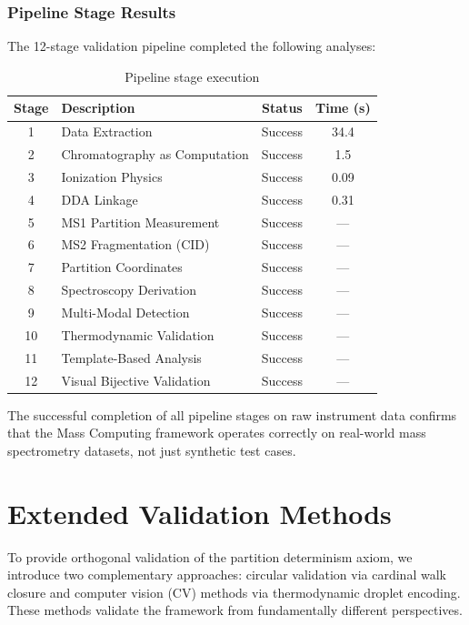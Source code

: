 \documentclass[twocolumn,10pt]{article}
\begin{document}
\subsubsection{Pipeline Stage Results}

The 12-stage validation pipeline completed the following analyses:

\begin{table}[H]
\centering
\caption{Pipeline stage execution}
\label{tab:pipeline_stages}
\begin{tabular}{clcc}
\toprule
\textbf{Stage} & \textbf{Description} & \textbf{Status} & \textbf{Time (s)} \\
\midrule
1 & Data Extraction & Success & 34.4 \\
2 & Chromatography as Computation & Success & 1.5 \\
3 & Ionization Physics & Success & 0.09 \\
4 & DDA Linkage & Success & 0.31 \\
5 & MS1 Partition Measurement & Success & --- \\
6 & MS2 Fragmentation (CID) & Success & --- \\
7 & Partition Coordinates & Success & --- \\
8 & Spectroscopy Derivation & Success & --- \\
9 & Multi-Modal Detection & Success & --- \\
10 & Thermodynamic Validation & Success & --- \\
11 & Template-Based Analysis & Success & --- \\
12 & Visual Bijective Validation & Success & --- \\
\bottomrule
\end{tabular}
\end{table}

The successful completion of all pipeline stages on raw instrument data confirms that the Mass Computing framework operates correctly on real-world mass spectrometry datasets, not just synthetic test cases.

\section{Extended Validation Methods}
\label{sec:extended_validation}

To provide orthogonal validation of the partition determinism axiom, we introduce two complementary approaches: circular validation via cardinal walk closure and computer vision (CV) methods via thermodynamic droplet encoding. These methods validate the framework from fundamentally different perspectives.
\end{document}
